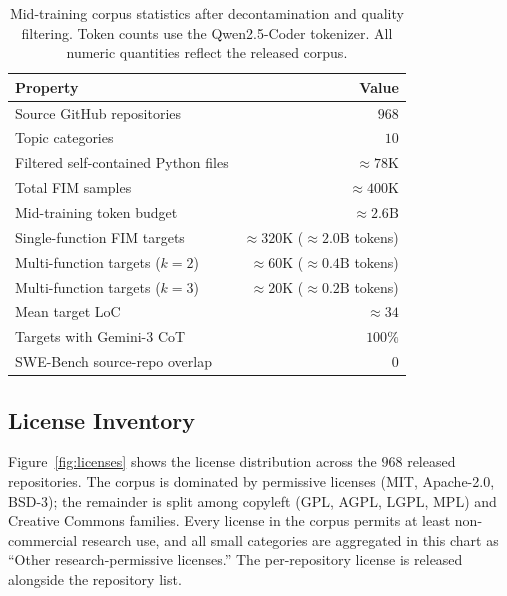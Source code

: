 \begin{table}[h]
\centering
\caption{Mid-training corpus statistics after decontamination and
quality filtering. Token counts use the Qwen2.5-Coder tokenizer.
All numeric quantities reflect the released corpus.}
\label{tab:dataset}
\small
\setlength{\tabcolsep}{6pt}
\begin{tabular}{lr}
\toprule
Property & Value \\
\midrule
Source GitHub repositories                       & $968$ \\
Topic categories                                 & $10$ \\
Filtered self-contained Python files             & $\approx 78\mathrm{K}$ \\
Total FIM samples                                & $\approx 400\mathrm{K}$ \\
Mid-training token budget                        & $\approx 2.6\mathrm{B}$ \\
\midrule
Single-function FIM targets                      & $\approx 320\mathrm{K}$ ($\approx 2.0\mathrm{B}$ tokens) \\
Multi-function targets ($k{=}2$)                 & $\approx 60\mathrm{K}$ ($\approx 0.4\mathrm{B}$ tokens) \\
Multi-function targets ($k{=}3$)                 & $\approx 20\mathrm{K}$ ($\approx 0.2\mathrm{B}$ tokens) \\
Mean target LoC                                  & $\approx 34$ \\
Targets with Gemini-3 CoT                        & $100\%$ \\
\midrule
SWE-Bench source-repo overlap                    & $0$ \\
\bottomrule
\end{tabular}
\end{table}

\subsection{License Inventory}
\label{app:data:license}

Figure~\ref{fig:licenses} shows the license distribution across the
$968$ released repositories. The corpus is dominated by permissive
licenses (MIT, Apache-2.0, BSD-3); the remainder is split among
copyleft (GPL, AGPL, LGPL, MPL) and Creative Commons families. Every
license in the corpus permits at least non-commercial research use, and
all small categories are aggregated in this chart as
``Other research-permissive licenses.'' The per-repository license is
released alongside the repository list.

